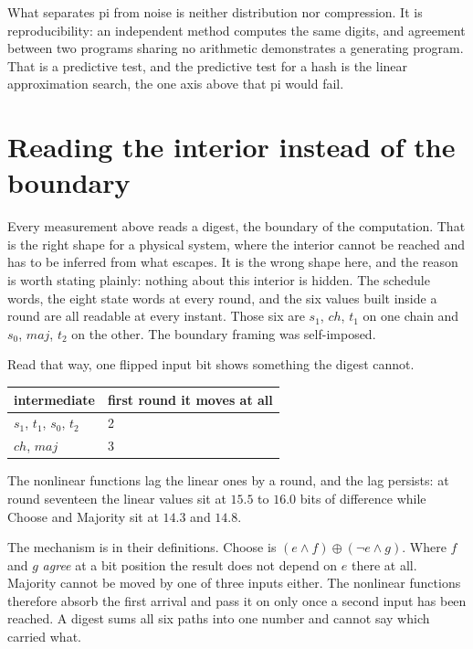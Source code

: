 What separates pi from noise is neither distribution nor compression. It is reproducibility: an independent method computes the same digits, and agreement between two programs sharing no arithmetic demonstrates a generating program. That is a predictive test, and the predictive test for a hash is the linear approximation search, the one axis above that pi would fail.

\section{Reading the interior instead of the boundary}

Every measurement above reads a digest, the boundary of the computation. That is the right shape for a physical system, where the interior cannot be reached and has to be inferred from what escapes. It is the wrong shape here, and the reason is worth stating plainly: nothing about this interior is hidden. The schedule words, the eight state words at every round, and the six values built inside a round are all readable at every instant. Those six are \(s_1\), \(\mathit{ch}\), \(t_1\) on one chain and \(s_0\), \(\mathit{maj}\), \(t_2\) on the other. The boundary framing was self-imposed.

Read that way, one flipped input bit shows something the digest cannot.

\begin{center}
\begin{tabular}{@{}ll@{}}
\toprule
intermediate & first round it moves at all \\
\midrule
\(s_1\), \(t_1\), \(s_0\), \(t_2\) & 2 \\
\(\mathit{ch}\), \(\mathit{maj}\) & 3 \\
\bottomrule
\end{tabular}
\end{center}

The nonlinear functions lag the linear ones by a round, and the lag persists: at round seventeen the linear values sit at \(15.5\) to \(16.0\) bits of difference while Choose and Majority sit at \(14.3\) and \(14.8\).

The mechanism is in their definitions. Choose is \((e \wedge f) \oplus (\neg e \wedge g)\). Where \(f\) and \(g\) \emph{agree} at a bit position the result does not depend on \(e\) there at all. Majority cannot be moved by one of three inputs either. The nonlinear functions therefore absorb the first arrival and pass it on only once a second input has been reached. A digest sums all six paths into one number and cannot say which carried what.

